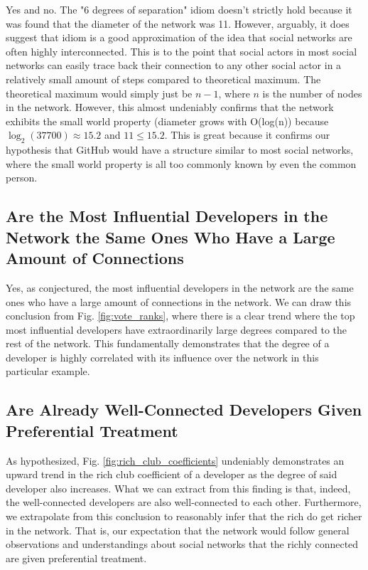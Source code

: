 \documentclass[9pt,twocolumn,twoside]{pnas-new}
\begin{document}
Yes and no. The "6 degrees of separation" idiom doesn't strictly hold because it was found that the diameter of the network was 11. However, arguably, it does suggest that idiom is a good approximation of the idea that social networks are often highly interconnected. This is to the point that social actors in most social networks can easily trace back their connection to any other social actor in a relatively small amount of steps compared to theoretical maximum. The theoretical maximum would simply just be $n-1$, where $n$ is the number of nodes in the network. However, this almost undeniably confirms that the network exhibits the small world property (diameter grows with O(log(n)) because $\log_{2}\left(37700\right) \approx 15.2$ and $11 \le 15.2$. This is great because it confirms our hypothesis that GitHub would have a structure similar to most social networks, where the small world property is all too commonly known by even the common person.

\subsection{Are the Most Influential Developers in the Network the Same Ones Who Have a Large Amount of Connections}

Yes, as conjectured, the most influential developers in the network are the same ones who have a large amount of connections in the network. We can draw this conclusion from Fig. \ref{fig:vote_ranks}, where there is a clear trend where the top most influential developers have extraordinarily large degrees compared to the rest of the network. This fundamentally demonstrates that the degree of a developer is highly correlated with its influence over the network in this particular example.

\subsection{Are Already Well-Connected Developers Given Preferential Treatment}

As hypothesized, Fig. \ref{fig:rich_club_coefficients} undeniably demonstrates an upward trend in the rich club coefficient of a developer as the degree of said developer also increases. What we can extract from this finding is that, indeed, the well-connected developers are also well-connected to each other. Furthermore, we extrapolate from this conclusion to reasonably infer that the rich do get richer in the network. That is, our expectation that the network would follow general observations and understandings about social networks that the richly connected are given preferential treatment.
\end{document}
